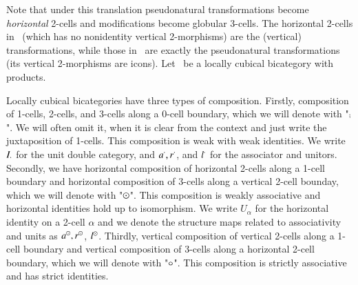 Note that under this translation pseudonatural transformations become \emph{horizontal} 2-cells and modifications become globular 3-cells.
The horizontal 2-cells in \cDblf\ (which has no nonidentity vertical 2-morphisms) are the (vertical) transformations, while those in \fBicat\ are exactly the pseudonatural transformations (its vertical 2-morphisms are icons).
Let \fB\ be a locally cubical bicategory with products.

Locally cubical bicategories have three types of composition. Firstly, composition of 1-cells, 2-cells, and 3-cells along a 0-cell boundary, which we will denote with "$\comp$". We will often omit it, when it is clear from the context and just write the juxtaposition of 1-cells. This composition is weak with weak identities. We write $I_{\cdot}$ for the unit double category, and $a^{\cdot}, r^{\cdot}$, and $l^{\cdot}$ for the associator and unitors. Secondly, we have horizontal composition of horizontal 2-cells along a 1-cell boundary and horizontal composition of 3-cells along a vertical 2-cell bounday, which we will denote with "$\odot$". This composition is weakly associative and horizontal identities hold up to isomorphism. We write $U_{\alpha}$ for the horizontal identity on a 2-cell 
$\alpha$ and we denote the structure maps related to associativity and units as $a^{\odot}, r^{\odot}$, $l^{\odot}$.
Thirdly, vertical composition of vertical 2-cells along a 1-cell boundary and vertical composition of 3-cells along a horizontal 2-cell boundary, which we will denote with "$\circ$". This composition is strictly associative and has strict identities.


